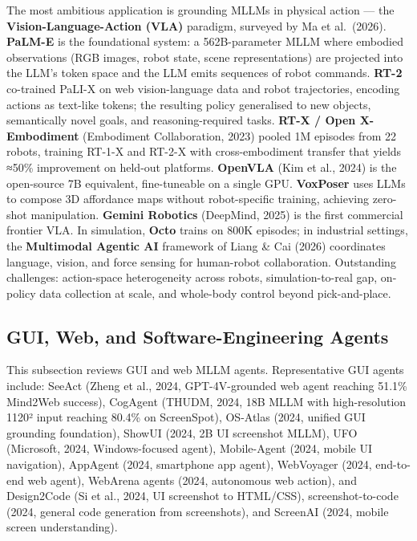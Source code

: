 \documentclass{article}
\begin{document}
The most ambitious application is grounding MLLMs in physical action --- the \textbf{Vision-Language-Action (VLA)} paradigm, surveyed by Ma et al.~(2026). \textbf{PaLM-E} \citep{driess20232023} is the foundational system: a 562B-parameter MLLM where embodied observations (RGB images, robot state, scene representations) are projected into the LLM's token space and the LLM emits sequences of robot commands. \textbf{RT-2} \citep{brohan20232023} co-trained PaLI-X on web vision-language data and robot trajectories, encoding actions as text-like tokens; the resulting policy generalised to new objects, semantically novel goals, and reasoning-required tasks. \textbf{RT-X / Open X-Embodiment} (Embodiment Collaboration, 2023) pooled 1M episodes from 22 robots, training RT-1-X and RT-2-X with cross-embodiment transfer that yields ≈50\% improvement on held-out platforms. \textbf{OpenVLA} (Kim et al., 2024) is the open-source 7B equivalent, fine-tuneable on a single GPU. \textbf{VoxPoser} \citep{huang20232023} uses LLMs to compose 3D affordance maps without robot-specific training, achieving zero-shot manipulation. \textbf{Gemini Robotics} (DeepMind, 2025) is the first commercial frontier VLA. In simulation, \textbf{Octo} trains on 800K episodes; in industrial settings, the \textbf{Multimodal Agentic AI} framework of Liang \& Cai (2026) coordinates language, vision, and force sensing for human-robot collaboration. Outstanding challenges: action-space heterogeneity across robots, simulation-to-real gap, on-policy data collection at scale, and whole-body control beyond pick-and-place.

\subsection{GUI, Web, and Software-Engineering Agents}\label{gui-web-and-software-engineering-agents}

This subsection reviews GUI and web MLLM agents. Representative GUI agents include: SeeAct (Zheng et al., 2024, GPT-4V-grounded web agent reaching 51.1\% Mind2Web success), CogAgent (THUDM, 2024, 18B MLLM with high-resolution 1120² input reaching 80.4\% on ScreenSpot), OS-Atlas (2024, unified GUI grounding foundation), ShowUI (2024, 2B UI screenshot MLLM), UFO (Microsoft, 2024, Windows-focused agent), Mobile-Agent (2024, mobile UI navigation), AppAgent (2024, smartphone app agent), WebVoyager (2024, end-to-end web agent), WebArena agents (2024, autonomous web action), and Design2Code (Si et al., 2024, UI screenshot to HTML/CSS), screenshot-to-code (2024, general code generation from screenshots), and ScreenAI (2024, mobile screen understanding).
\end{document}
